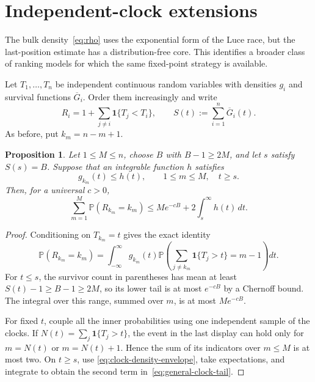\documentclass[11pt]{article}
\newtheorem{proposition}[theorem]{Proposition}
\theoremstyle{remark}
\theoremstyle{plain}
\newcommand{\Pp}{\mathbb P}
\newcommand{\one}{\mathbf 1}
\begin{document}
\section{Independent-clock extensions}\label{sec:clock-extensions}

The bulk density~\eqref{eq:rho} uses the exponential form of the Luce race,
but the last-position estimate has a distribution-free core.  This identifies
a broader class of ranking models for which the same fixed-point strategy is
available.

Let $T_1,\ldots,T_n$ be independent continuous random variables with
densities $g_i$ and survival functions $\overline G_i$.  Order them
increasingly and write
\[
 R_i=1+\sum_{j\ne i}\one\{T_j<T_i\},\qquad
 S(t):=\sum_{i=1}^n\overline G_i(t).
\]
As before, put $k_m=n-m+1$.

\begin{proposition}
\label{prop:general-clock-tail}
Let $1\le M\le n$, choose $B$ with $B-1\ge2M$, and let $s$ satisfy
$S(s)=B$.  Suppose that an integrable function $h$ satisfies
\begin{equation}\label{eq:clock-density-envelope}
 g_{k_m}(t)\le h(t),\qquad 1\le m\le M,\quad t\ge s.
\end{equation}
Then, for a universal $c>0$,
\begin{equation}\label{eq:general-clock-tail}
 \sum_{m=1}^M\Pp(R_{k_m}=k_m)
 \le M e^{-cB}+2\int_s^\infty h(t)\,dt.
\end{equation}
\end{proposition}

\begin{proof}
Conditioning on $T_{k_m}=t$ gives the exact identity
\[
 \Pp(R_{k_m}=k_m)=\int_{-\infty}^{\infty}g_{k_m}(t)
 \Pp\left(\sum_{j\ne k_m}\one\{T_j>t\}=m-1\right)dt.
\]
For $t\le s$, the survivor count in parentheses has mean at least
$S(t)-1\ge B-1\ge2M$, so its lower tail is at most $e^{-cB}$ by a Chernoff
bound.  The integral over this range, summed over $m$, is at most
$Me^{-cB}$.

For fixed $t$, couple all the inner probabilities using one independent
sample of the clocks.  If $N(t)=\sum_j\one\{T_j>t\}$, the event in the last
display can hold only for $m=N(t)$ or $m=N(t)+1$.  Hence the sum of its
indicators over $m\le M$ is at most two.  On $t\ge s$, use
\eqref{eq:clock-density-envelope}, take expectations, and integrate to obtain
the second term in~\eqref{eq:general-clock-tail}.
\end{proof}
\end{document}
